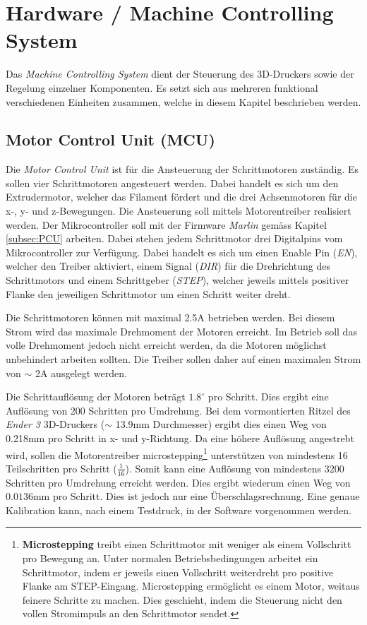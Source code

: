 \clearpage
\section{Hardware / Machine Controlling System}\label{sec:Hardware}
Das \textit{Machine Controlling System} dient der Steuerung des 3D-Druckers sowie der Regelung einzelner Komponenten. Es setzt sich aus mehreren funktional verschiedenen Einheiten zusammen, welche in diesem Kapitel beschrieben werden.


\subsection{Motor Control Unit (MCU)}\label{subsec:MCU}
Die \textit{Motor Control Unit} ist für die Ansteuerung der Schrittmotoren zuständig. Es sollen vier Schrittmotoren angesteuert werden. Dabei handelt es sich um den Extrudermotor, welcher das Filament fördert und die drei Achsenmotoren für die x-, y- und z-Bewegungen. Die Ansteuerung soll mittels Motorentreiber realisiert werden. Der Mikrocontroller soll mit der Firmware \textit{Marlin} gemäss Kapitel \ref{subsec:PCU} arbeiten. Dabei stehen jedem Schrittmotor drei Digitalpins vom Mikrocontroller zur Verfügung. Dabei handelt es sich um einen Enable Pin (\textit{EN}), welcher den Treiber aktiviert, einem Signal (\textit{DIR}) für die Drehrichtung des Schrittmotors und einem Schrittgeber (\textit{STEP}), welcher jeweils mittels positiver Flanke den jeweiligen Schrittmotor um einen Schritt weiter dreht. 

Die Schrittmotoren können mit maximal 2.5A betrieben werden. Bei diesem Strom wird das maximale Drehmoment der Motoren erreicht. Im Betrieb soll das volle Drehmoment jedoch nicht erreicht werden, da die Motoren möglichst unbehindert arbeiten sollten. Die Treiber sollen daher auf einen maximalen Strom von $\sim$ 2A ausgelegt werden.

Die Schrittauflösung der Motoren beträgt $1.8^\circ$ pro Schritt. Dies ergibt eine Auflösung von 200 Schritten pro Umdrehung. Bei dem vormontierten Ritzel des \textit{Ender 3} 3D-Druckers ($\sim$ 13.9mm Durchmesser) ergibt dies einen Weg von 0.218mm pro Schritt in x- und y-Richtung. Da eine höhere Auflösung angestrebt wird, sollen die Motorentreiber microstepping\footnote{\textbf{Microstepping} treibt einen Schrittmotor mit weniger als einem Vollschritt pro Bewegung an. Unter normalen Betriebsbedingungen arbeitet ein Schrittmotor, indem er jeweils einen Vollschritt weiterdreht pro positive Flanke am STEP-Eingang. Microstepping ermöglicht es einem Motor, weitaus feinere Schritte zu machen. Dies geschieht, indem die Steuerung nicht den vollen Stromimpuls an den Schrittmotor sendet.} unterstützen von mindestens 16 Teilschritten pro Schritt ($\frac{1}{16}$). Somit kann eine Auflösung von mindestens 3200 Schritten pro Umdrehung erreicht werden. Dies ergibt wiederum einen Weg von $0.0136$mm pro Schritt. Dies ist jedoch nur eine Überschlagsrechnung. Eine genaue Kalibration kann, nach einem Testdruck, in der Software vorgenommen werden. 

